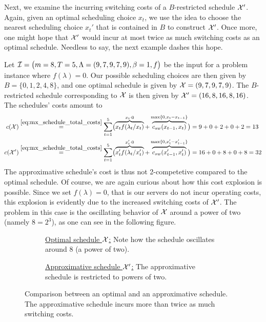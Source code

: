 Next, we examine the incurring switching costs of a $B$-restricted schedule $\mathcal{X}'$. Again, given an optimal scheduling choice $x_t$, we use the idea to choose the nearest scheduling choice $x_t'$ that is contained in $B$ to construct $\mathcal{X}'$. Once more, one might hope that $\mathcal{X}'$ would incur at most twice as much switching costs as an optimal schedule. Needless to say, the next example dashes this hope.
\begin{exmpl}
Let $\mathcal{I}=\bigl(m=8,T=5,\Lambda=(9,7,9,7,9),\beta=1,f\bigr)$ be the input for a problem instance where $f(\lambda)=0$. Our possible scheduling choices are then given by $B=\{0,1,2,4,8\}$, and one optimal schedule is given by $\mathcal{X}=(9,7,9,7,9)$. The $B$-restricted schedule corresponding to $\mathcal{X}$ is then given by $\mathcal{X}'=(16,8,16,8,16)$. The schedules' costs amount to
\begin{align*}
	c(\mathcal{X})&\stackrel{\eqref{eq:mx_schedule_total_costs}}{=}\sum\limits_{t=1}^{5}\bigl(\overbrace{x_tf(\lambda_t/x_t)}^{x_t\cdot 0}+\overbrace{c_{sw}(x_{t-1},x_t)}^{\max\{0,x_t-x_{t-1}\}}\bigr)=9+0+2+0+2=13\\
	c(\mathcal{X}')&\stackrel{\eqref{eq:mx_schedule_total_costs}}{=}\sum\limits_{t=1}^{5}\bigl(\overbrace{x_t'f(\lambda_t/x_t')}^{x_t'\cdot 0}+\overbrace{c_{sw}(x_{t-1}',x_t')}^{\max\{0,x_t'-x_{t-1}'\}}\bigr)=16+0+8+0+8=32
\end{align*}
The approximative schedule's cost is thus not 2-competetive compared to the optimal schedule. Of course, we are again curious about how this cost explosion is possible. Since we set $f(\lambda)=0$, that is our servers do not incur operating costs, this explosion is evidently due to the increased switching costs of $\mathcal{X}'$. The problem in this case is the oscillating behavior of $\mathcal{X}$ around a power of two (namely $8=2^3$), as one can see in the following figure. 
\begin{figure}[H]
\captionsetup[subfigure]{labelformat=empty}
\begin{subfigure}[b]{0.5\textwidth}

	\caption{\underline{Optimal schedule $\mathcal{X}$:} Note how the schedule oscillates around 8 (a power of two).}
\end{subfigure}
\hfill
\begin{subfigure}[b]{0.5\textwidth}

	\caption{\underline{Approximative schedule $\mathcal{X}'$:} The approximative schedule is restricted to powers of two.}
\end{subfigure}
\caption{Comparison between an optimal and an approximative schedule. The approximative schedule incurs more than twice as much switching costs.}
\label{fig:adaption-schedule}
\end{figure}
\end{exmpl}
